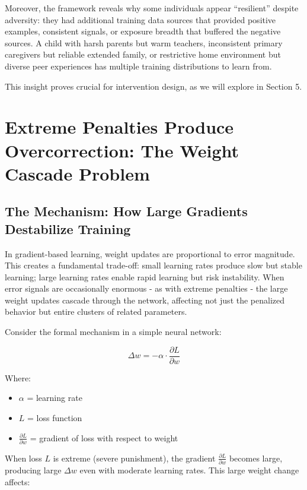 \documentclass{article}
\begin{document}
Moreover, the framework reveals why some individuals appear ``resilient'' despite adversity: they had additional training data sources that provided positive examples, consistent signals, or exposure breadth that buffered the negative sources. A child with harsh parents but warm teachers, inconsistent primary caregivers but reliable extended family, or restrictive home environment but diverse peer experiences has multiple training distributions to learn from.

This insight proves crucial for intervention design, as we will explore in Section 5.

\section{Extreme Penalties Produce Overcorrection: The Weight Cascade Problem}

\subsection{The Mechanism: How Large Gradients Destabilize Training}

In gradient-based learning, weight updates are proportional to error magnitude. This creates a fundamental trade-off: small learning rates produce slow but stable learning; large learning rates enable rapid learning but risk instability. When error signals are occasionally enormous - as with extreme penalties - the large weight updates cascade through the network, affecting not just the penalized behavior but entire clusters of related parameters.

Consider the formal mechanism in a simple neural network:

\begin{equation}
\Delta w = -\alpha \cdot \frac{\partial L}{\partial w}
\end{equation}

Where:
\begin{itemize}
\item $\alpha$ = learning rate
\item $L$ = loss function
\item $\frac{\partial L}{\partial w}$ = gradient of loss with respect to weight
\end{itemize}

When loss $L$ is extreme (severe punishment), the gradient $\frac{\partial L}{\partial w}$ becomes large, producing large $\Delta w$ even with moderate learning rates. This large weight change affects:
\end{document}

